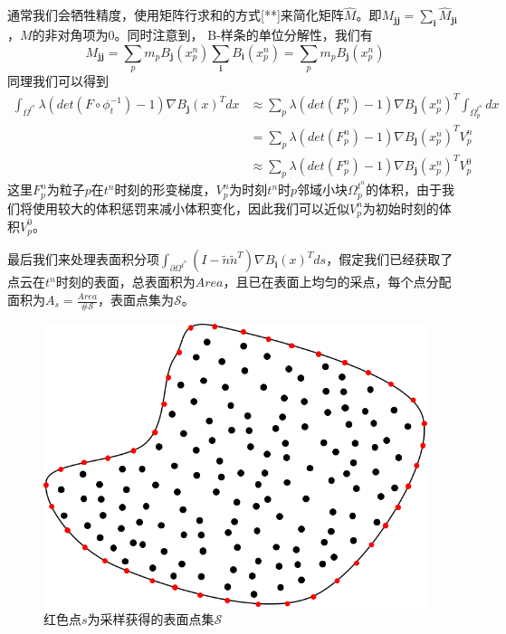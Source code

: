 通常我们会牺牲精度，使用矩阵行求和的方式[**]来简化矩阵$\hat{M}$。即$M_{\mathbf{jj}} = \sum_{\mathbf{i}}\hat{M}_{\mathbf{ji}}$，$M$的非对角项为0。同时注意到，
B-样条的单位分解性，我们有
$$M_{\mathbf{jj}} = \sum_p m_p B_{\mathbf{j}}(x_p^n)\sum_\mathbf{i}B_\mathbf{i}(x_p^n) = \sum_p m_p B_{\mathbf{j}}(x_p^n)$$
同理我们可以得到
\begin{align}
    \int_{\Omega^{t^n}}\lambda (det(F\circ \phi_t^{-1}) - 1)\nabla B_{\mathbf{j}}(x)^Tdx &\approx \sum_p \lambda (det(F_p^n) - 1)\nabla B_{\mathbf{j}}(x_p^n)^T\int_{\Omega^{t^n}_p}dx \nonumber\\
    & = \sum_p \lambda (det(F_p^n) - 1)\nabla B_{\mathbf{j}}(x_p^n)^T V_p^n\nonumber \\
    & \approx \sum_p \lambda (det(F_p^n) - 1)\nabla B_{\mathbf{j}}(x_p^n)^T V_p^0\nonumber     
\end{align}
这里$F_p^n$为粒子$p$在$t^n$时刻的形变梯度，$V_p^n$为时刻$t^n$时$p$邻域小块$\Omega_p^{t^n}$的体积，由于我们将使用较大的体积惩罚来减小体积变化，因此我们可以近似$V_p^n$为初始时刻的体积$V_p^0$。

最后我们来处理表面积分项$\int_{\partial \Omega^{t^n}} (I - \tilde{n}\tilde{n}^T)\nabla B_{\mathbf{i}}(x)^T ds$，假定我们已经获取了点云在$t^n$时刻的表面，总表面积为$Area$，且已在表面上均匀的采点，每个点分配面积为$A_s = \frac{Area}{\#\mathcal{S}}$，表面点集为$\mathcal{S}$。
\begin{figure}[htbp]
    \centering
    \includegraphics[scale=0.4]{./images/image12.png}
    \caption{红色点$s$为采样获得的表面点集$\mathcal{S}$}
    \label{fig: surface of point cloud}
\end{figure}

